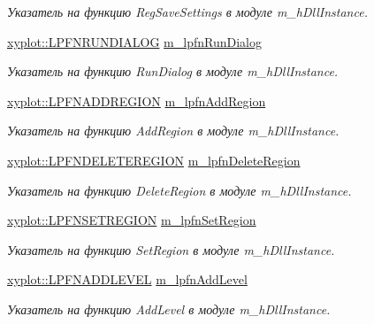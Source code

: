 \begin{DoxyCompactItemize}
\begin{DoxyCompactList}\small\item\em Указатель на функцию Reg\-Save\-Settings в модуле m\-\_\-h\-Dll\-Instance. \end{DoxyCompactList}\item 
\hyperlink{namespacexyplot_a63fcd576a6d31af2655357ffa3ea7b74}{xyplot\-::\-L\-P\-F\-N\-R\-U\-N\-D\-I\-A\-L\-O\-G} \hyperlink{group__gr_func_pointers_ga6ee84aa8c78971f94a8abb1bd5ed9558}{m\-\_\-lpfn\-Run\-Dialog}
\begin{DoxyCompactList}\small\item\em Указатель на функцию Run\-Dialog в модуле m\-\_\-h\-Dll\-Instance. \end{DoxyCompactList}\item 
\hyperlink{namespacexyplot_a0aaffe16c53538a1e712cdc6caef070f}{xyplot\-::\-L\-P\-F\-N\-A\-D\-D\-R\-E\-G\-I\-O\-N} \hyperlink{group__gr_func_pointers_gaccaf69dea4abee8034cf3d7e4164ac3d}{m\-\_\-lpfn\-Add\-Region}
\begin{DoxyCompactList}\small\item\em Указатель на функцию Add\-Region в модуле m\-\_\-h\-Dll\-Instance. \end{DoxyCompactList}\item 
\hyperlink{namespacexyplot_ad184f4d62ca85e471cef796c79dd0b4c}{xyplot\-::\-L\-P\-F\-N\-D\-E\-L\-E\-T\-E\-R\-E\-G\-I\-O\-N} \hyperlink{group__gr_func_pointers_gaf02bf6794063914ee9dbe34fb0d29c0e}{m\-\_\-lpfn\-Delete\-Region}
\begin{DoxyCompactList}\small\item\em Указатель на функцию Delete\-Region в модуле m\-\_\-h\-Dll\-Instance. \end{DoxyCompactList}\item 
\hyperlink{namespacexyplot_a048931557c2d0bfaa041629319bb118d}{xyplot\-::\-L\-P\-F\-N\-S\-E\-T\-R\-E\-G\-I\-O\-N} \hyperlink{group__gr_func_pointers_gae81937286e2936ec1f24abfd7334c364}{m\-\_\-lpfn\-Set\-Region}
\begin{DoxyCompactList}\small\item\em Указатель на функцию Set\-Region в модуле m\-\_\-h\-Dll\-Instance. \end{DoxyCompactList}\item 
\hyperlink{namespacexyplot_acfe1c4a6bf88e4c101cae03f31602993}{xyplot\-::\-L\-P\-F\-N\-A\-D\-D\-L\-E\-V\-E\-L} \hyperlink{group__gr_func_pointers_ga62b0b0bd4d99cf0d395c6ebe713fadfa}{m\-\_\-lpfn\-Add\-Level}
\begin{DoxyCompactList}\small\item\em Указатель на функцию Add\-Level в модуле m\-\_\-h\-Dll\-Instance. \end{DoxyCompactList}\item 

\end{DoxyCompactItemize}
